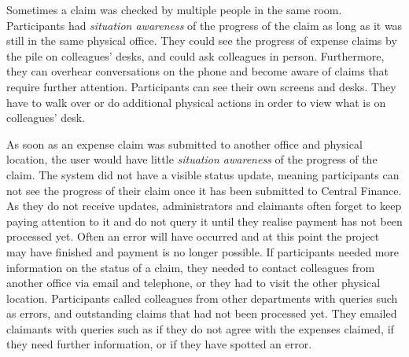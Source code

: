 Sometimes a claim was checked by multiple people in the same room. Participants had \textit{situation awareness} of the progress of the claim as long as it was still in the same physical office. They could see the progress of expense claims by the pile on colleagues' desks, and could ask colleagues in person. Furthermore, they can overhear conversations on the phone and become aware of claims that require further attention. Participants can see their own screens and desks. They have to walk over or do additional physical actions in order to view what is on colleagues' desk.  

As soon as an expense claim was submitted to another office and physical location, the user would have little \textit{situation awareness} of the progress of the claim. The system did not have a visible status update, meaning participants can not see the progress of their claim once it has been submitted to Central Finance. As they do not receive updates, administrators and claimants often forget to keep paying attention to it and do not query it until they realise payment has not been processed yet. Often an error will have occurred and at this point the project may have finished and payment is no longer possible. If participants needed more information on the status of a claim, they needed to contact colleagues from another office via email and telephone, or they had to visit the other physical location.  Participants called colleagues from other departments with queries such as errors, and outstanding claims that had not been processed yet. They emailed claimants with queries such as if they do not agree with the expenses claimed, if they need further information, or if they have spotted an error.


